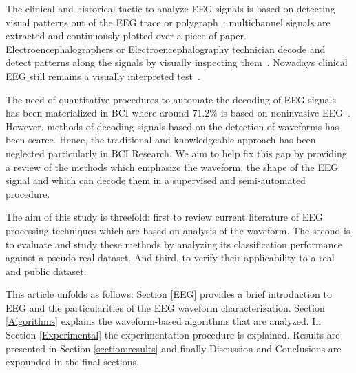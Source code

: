 \documentclass[brainsci,article,accept,moreauthors,pdftex,10pt,a4paper]{mdpi}
\begin{document}
The clinical and historical tactic to analyze EEG signals is based on detecting visual patterns out of the EEG trace or polygraph~\citep{Hartman2005}: multichannel signals are extracted and continuously plotted over a piece of paper. Electroencephalographers or Electroencephalography technician decode and detect patterns along the signals by visually inspecting them~\citep{Schomer2010}.   Nowadays clinical EEG still remains a visually interpreted test~\citep{Hartman2005}.


The need of quantitative procedures to automate the decoding of EEG signals has been materialized in BCI where around $71.2\%$ is based on noninvasive EEG~\citep{Guger2017}.  However, methods of decoding signals based on the detection of waveforms has been scarce. Hence, the traditional and knowledgeable approach has been neglected particularly in BCI Research. We aim to help fix this gap by providing a review of the methods which emphasize the waveform, the shape of the EEG signal and which can decode them in a supervised and semi-automated procedure.

The aim of this study is threefold: first to review current literature of EEG processing techniques which are based on analysis of the waveform.  The second is to evaluate and study these methods by analyzing its classification performance against a pseudo-real dataset. And third, to verify their applicability to a real and public dataset.  


This article unfolds as follows: Section \ref{EEG} provides a brief introduction to EEG and the particularities of the EEG waveform characterization.  Section \ref{Algorithms} explains the waveform-based algorithms that are analyzed.  In Section \ref{Experimental} the experimentation procedure is explained.  Results are presented in Section \ref{section:results} and finally Discussion and Conclusions are expounded in the final sections.
\end{document}
